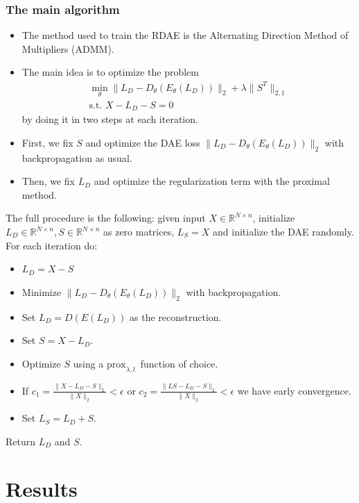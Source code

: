 \documentclass{beamer}
\theoremstyle{plain}
\theoremstyle{definition}
\theoremstyle{remark}
\newcommand{\R}{\mathbb{R}}
\newcommand{\norm}[1]{\lVert#1\rVert}
\newcommand{\prox}{\text{prox}}
\begin{document}
\begin{frame}
	\frametitle{The main algorithm}
	\begin{itemize}
		\item The method used to train the RDAE is the Alternating Direction Method of Multipliers (ADMM).
		\item The main idea is to optimize the problem
			\begin{align}
				\min_{\theta}{\norm{L_D -D_{\theta}(E_{\theta}(L_D))}_2 + \lambda\norm{S^T}_{2,1}}\\
				\text{s.t. }X-L_D-S=0  
			\end{align}
			by doing it in two steps at each iteration.
		\item First, we fix $S$ and optimize the DAE loss $\norm{L_D -D_{\theta}(E_{\theta}(L_D))}_2$ with backpropagation as usual.
		\item Then, we fix $L_D$ and optimize the regularization term with the proximal method.
	\end{itemize}
\end{frame}

\begin{frame}
	The full procedure is the following: given input $X\in \R^{N\times n}$, initialize $L_D\in \R^{N\times n}, S\in \R^{N\times n}$ as zero matrices, 
	$L_S = X$ and initialize the DAE randomly. For each iteration do:
	\begin{itemize}
		\item $L_D = X - S$
		\item Minimize $\norm{L_D -D_{\theta}(E_{\theta}(L_D))}_2$ with backpropagation.
		\item Set $L_D = D(E(L_D))$ as the reconstruction.
		\item Set $S = X - L_D$.
		\item Optimize $S$ using a $\prox_{\lambda, l_{\cdot}}$ function of choice.
		\item If $c_1 = \frac{\norm{X-L_D-S}_2}{\norm{X}_2} < \epsilon$ or $c_2 = \frac{\norm{LS-L_D-S}_2}{\norm{X}_2} < \epsilon$ we have early convergence.
		\item Set $L_S = L_D + S$.
	\end{itemize}
	Return $L_D$ and $S$.
\end{frame}

\section{Results}
\end{document}

